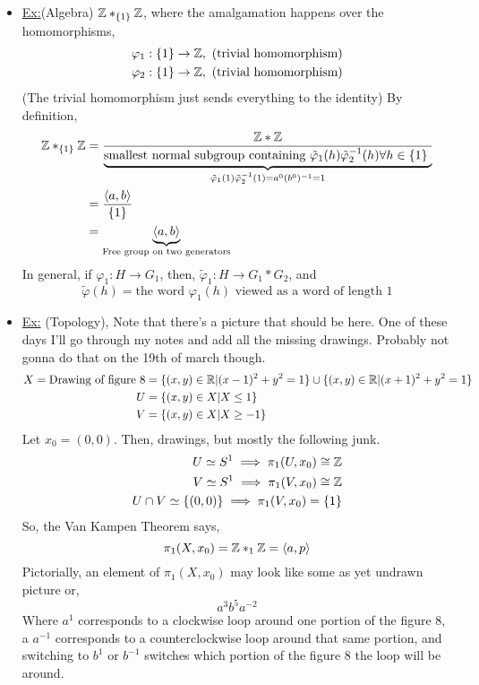 \documentclass[../notes.tex]{subfiles}
\begin{document}
\begin{itemize}
    \item \underline{Ex:}(Algebra) $\mathbb{Z}*_{\{1\}}\mathbb{Z}$, where the amalgamation happens
        over the homomorphisms,
        \begin{align*}
            \varphi_1: \{1\} \rightarrow \mathbb{Z},\ \text{(trivial homomorphism)}\\
            \varphi_2: \{1\} \rightarrow \mathbb{Z},\ \text{(trivial homomorphism)}\\
        \end{align*}
        (The trivial homomorphism just sends everything to the identity)
        By definition,
        \begin{align*}
            \mathbb{Z}*_{\{1\}}\mathbb{Z} &= \frac{\mathbb{Z} * \mathbb{Z}}{
                \underbrace{\text{smallest normal subgroup containing $
                    \tilde{\varphi}_1(h)\tilde{\varphi}_2^{-1}(h)\forall h\in\{1\}$
                }
                }_{\tilde{\varphi}_1(1)\tilde{\varphi}_2^{-1}(1)=a^0(b^0)^{-1}=1}
            }\\
            &=\frac{\langle a,b \rangle}{\{1\}}\\
            &=\underbrace{\langle a,b \rangle}_{\text{Free group on two generators}}
        \end{align*}
        In general, if $\varphi_1:H\rightarrow G_1$, then, 
        $\tilde{\varphi}_1:H\rightarrow G_1 * G_2$, and 
        \[
            \tilde{\varphi}(h)=\text{the word $\varphi_1(h)$ viewed as a word of length 1}
        \]
    \item \underline{Ex:} (Topology), Note that there's a picture that should be here.
        One of these days I'll go through my notes and add all the missing drawings. Probably
        not gonna do that on the 19th of march though.
        \begin{align*}
            X = \text{Drawing of figure 8}&=\{(x,y)\in \mathbb{R}|(x-1)^2+y^2=1\}\cup
            \{(x,y)\in \mathbb{R}|(x+1)^2+y^2=1\}\\
            U&=\{(x,y)\in X|X\le 1\}\\
            V&=\{(x,y)\in X|X\ge -1\}\\
        \end{align*}
        Let $x_0=(0,0)$. Then, drawings, but mostly the following junk.
        \begin{align*}
            U\simeq S^1\implies \pi_1(U, x_0)\cong \mathbb{Z}\\
            V\simeq S^1\implies \pi_1(V, x_0)\cong \mathbb{Z}\\
            U\cap V\simeq \{(0,0)\}\implies \pi_1(V, x_0)=\{1\}\\
        \end{align*}
        So, the Van Kampen Theorem says,
        \[
            \pi_1(X,x_0)=\mathbb{Z}*_{1}\mathbb{Z}=\langle a,p \rangle
        \]
        Pictorially, an element of $\pi_1(X,x_0)$ may look like some as yet undrawn
        picture or,
        \[
            a^3b^5a^{-2}
        \]
        Where $a^1$ corresponds to a clockwise loop around one portion of the figure 8,
        a $a^{-1}$ corresponds to a counterclockwise loop around that same portion, and
        switching to $b^1$ or $b^{-1}$ switches which portion of the figure 8 the loop will be around.
\end{itemize}
\end{document}

